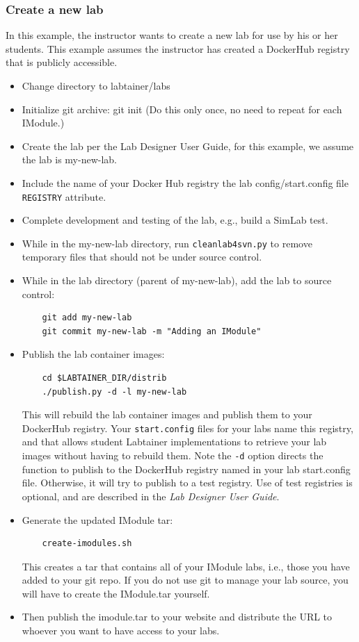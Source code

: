 \documentclass[12pt]{article}
\begin{document}
\subsubsection{Create a new lab}
In this example, the instructor wants to create a new lab for use by his or her students.
This example assumes the instructor has created a DockerHub registry that is publicly accessible.
\begin{itemize}
\item Change directory to labtainer/labs
\item Initialize git archive: git init  (Do this only once, no need to repeat for each IModule.)  
\item Create the lab per the Lab Designer User Guide, for this example, we assume the lab is my-new-lab.
\item Include the name of your Docker Hub registry the lab config/start.config file {\tt REGISTRY} attribute.
\item Complete development and testing of the lab, e.g., build a SimLab test.
\item While in the my-new-lab directory, run {\tt cleanlab4svn.py} to remove temporary files that should not be under source control.
\item While in the lab directory (parent of my-new-lab), add the lab to source control:
\begin{verbatim}
    git add my-new-lab
    git commit my-new-lab -m "Adding an IModule"
\end{verbatim}
\item Publish the lab container images: 
\begin{verbatim}
    cd $LABTAINER_DIR/distrib
    ./publish.py -d -l my-new-lab
\end{verbatim}
\noindent This will rebuild the lab container images and publish them to your DockerHub registry.  Your {\tt start.config} files for 
your labs name this registry, and that allows student Labtainer implementations to retrieve your lab images without having to rebuild them.
Note the {\tt -d} option directs the 
function to publish to the DockerHub registry named in your lab start.config file.  Otherwise, it will try to publish to a test registry.
Use of test registries is optional, and are described in the \textit{Lab Designer User Guide}.
\item Generate the updated IModule tar:
\begin{verbatim}
    create-imodules.sh
\end{verbatim}
\noindent This creates a tar that contains all of your IModule labs, i.e., those you have added to your git repo.  If you do not use git
to manage your lab source, you will have to create the IModule.tar yourself.
\item Then publish the imodule.tar to your website and distribute the URL to whoever you want to have access to your labs. 
\end{itemize}
\end{document}
